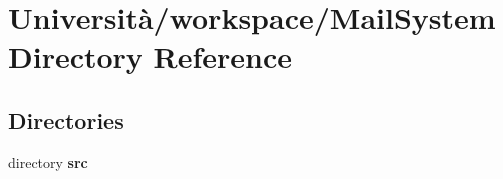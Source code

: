 \section{Università/workspace/\+Mail\+System Directory Reference}
\label{dir_2740192525379a3b1013f5281d7fbb6a}
\subsection*{Directories}
\begin{DoxyCompactItemize}
\item 
directory \textbf{ src}
\end{DoxyCompactItemize}
